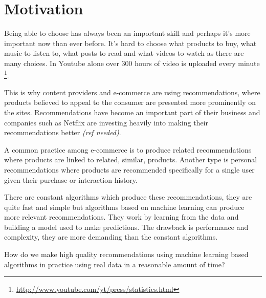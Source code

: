 
\section{Motivation}\label{sec:intro:motivation}

Being able to choose has always been an important skill and perhaps it's more important now than ever before. It's hard to choose what products to buy, what music to listen to, what posts to read and what videos to watch as there are many choices. In Youtube alone over 300 hours of video is uploaded every minute \footnote{\url{http://www.youtube.com/yt/press/statistics.html}}.

This is why content providers and e-commerce are using recommendations, where products believed to appeal to the consumer are presented more prominently on the sites. Recommendations have become an important part of their business and companies such as Netflix are investing heavily into making their recommendations better \textit{(ref needed)}.

A common practice among e-commerce is to produce related recommendations where products are linked to related, similar, products. Another type is personal recommendations where products are recommended specifically for a single user given their purchase or interaction history.

There are constant algorithms which produce these recommendations, they are quite fast and simple but algorithms based on machine learning can produce more relevant recommendations. They work by learning from the data and building a model used to make predictions. The drawback is performance and complexity, they are more demanding than the constant algorithms.

How do we make high quality recommendations using machine learning based algorithms in practice using real data in a reasonable amount of time?

